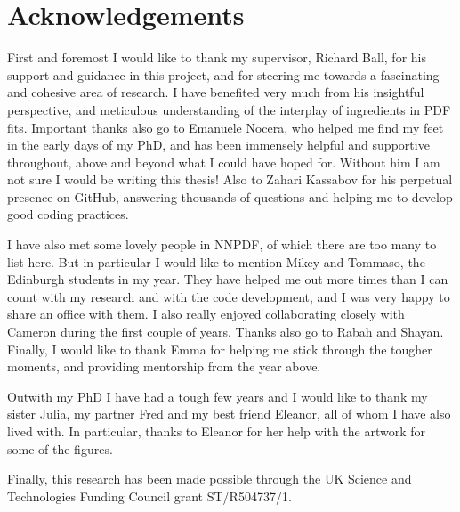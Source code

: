 \chapter{Acknowledgements}

\noindent

\normalsize

First and foremost I would like to thank my supervisor, Richard Ball, for his support and guidance in this project, and for steering me towards a fascinating and cohesive area of research. I have benefited very much from his insightful perspective, and meticulous understanding of the interplay of ingredients in PDF fits. Important thanks also go to Emanuele Nocera, who helped me find my feet in the early days of my PhD, and has been immensely helpful and supportive throughout, above and beyond what I could have hoped for. Without him I am not sure I would be writing this thesis! Also to Zahari Kassabov for his perpetual presence on GitHub, answering thousands of questions and helping me to develop good coding practices. 

I have also met some lovely people in NNPDF, of which there are too many to list here. But in particular I would like to mention Mikey and Tommaso, the Edinburgh students in my year. They have helped me out more times than I can count with my research and with the code development, and I was very happy to share an office with them. I also really enjoyed collaborating closely with Cameron during the first couple of years. Thanks also go to Rabah and Shayan. Finally, I would like to thank Emma for helping me stick through the tougher moments, and providing mentorship from the year above. 

Outwith my PhD I have had a tough few years and I would like to thank my sister Julia, my partner Fred and my best friend Eleanor, all of whom I have also lived with. In particular, thanks to Eleanor for her help with the artwork for some of the figures. 

Finally, this research has been made possible through the UK Science and Technologies Funding Council grant ST/R504737/1.

